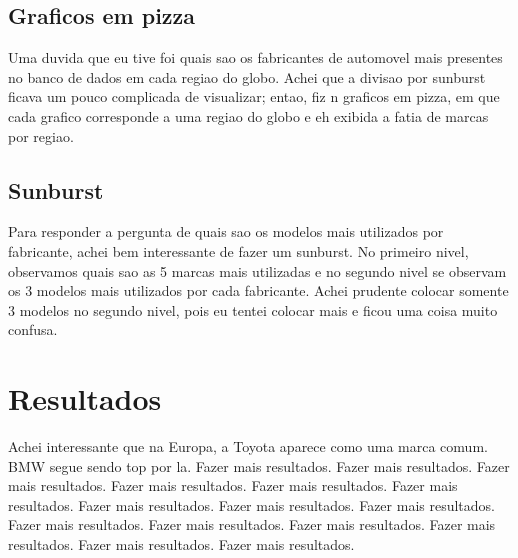\documentclass[10pt, conference]{IEEEtran}
\begin{document}
\subsection{Graficos em pizza}

Uma duvida que eu tive foi quais sao os fabricantes de automovel mais presentes no banco de dados em cada regiao 
do globo. Achei que a divisao por sunburst ficava um pouco complicada de visualizar; entao, fiz n graficos
em pizza, em que cada grafico corresponde a uma regiao do globo e eh exibida a fatia de marcas por regiao.



\subsection{Sunburst}

Para responder a pergunta de quais sao os modelos mais utilizados por fabricante, achei bem interessante
de fazer um sunburst. No primeiro nivel, observamos quais sao as 5 marcas mais utilizadas e no segundo nivel
se observam os 3 modelos mais utilizados por cada fabricante. Achei prudente colocar somente 3 modelos no segundo
nivel, pois eu tentei colocar mais e ficou uma coisa muito confusa.




\section{Resultados}
%
Achei interessante que na Europa, a Toyota aparece como uma marca comum. BMW segue sendo top por la.
Fazer mais resultados. Fazer mais resultados. Fazer mais resultados. Fazer mais resultados. Fazer mais resultados. 
Fazer mais resultados. Fazer mais resultados. Fazer mais resultados. Fazer mais resultados. Fazer mais resultados. 
Fazer mais resultados. Fazer mais resultados. Fazer mais resultados. Fazer mais resultados. Fazer mais resultados. 




%
\end{document}
